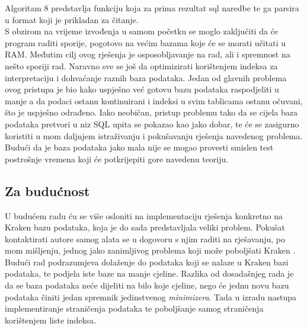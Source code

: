 \documentclass[times, utf8, zavrsni]{fer}
\begin{document}
Algoritam 8 predstavlja funkciju koja za prima rezultat sql naredbe te ga parsira u format koji je prikladan za čitanje.
\\S obzirom na vrijeme izvođenja u samom početku se moglo zaključiti da će program raditi sporije, pogotovo na većim bazama koje će se morati učitati u RAM. Međutim cilj ovog rješenja je osposobljavanje na rad, ali i spremnost na nešto sporiji rad. Naravno sve se još da optimizirati korištenjem indeksa za interpretaciju i dohvaćanje raznih baza podataka. Jedan od glavnih problema ovog pristupa je bio kako uspješno već gotovu bazu podataka raspodjeliti u manje a da podaci ostanu kontinuirani i indeksi u svim tablicama ostanu očuvani, što je uspješno odrađeno. Iako neobičan, pristup problemu tako da se cijela baza podataka pretvori u niz SQL upita se pokazao kao jako dobar, te će se zasigurno koristiti u mom daljnjem istraživanju i pokušavanju rješenja navedenog problema. Budući da je baza podataka jako mala nije se mogao provesti smislen test postrošnje vremena koji će potkrijepiti gore navedenu teoriju.
\subsection{Za budućnost}
U budućem radu ću se više osloniti na implementaciju rješenja konkretno na Kraken bazu podataka, koja je do sada predstavljala veliki problem. Pokušat kontaktirati autore samog alata se u dogovoru s njim raditi na rješavanju, po mom mišljenju, jednog jako zanimljivog problema koji može poboljšati Kraken . Budući rad podrazumjeva dolaženje do podataka koji se nalaze u Kraken bazi podataka, te podjela iste baze na manje cjeline. Razlika od dosadašnjeg rada je da se baza podataka neće dijeliti na bilo koje cjeline, nego će jednu novu bazu podataka činiti jedan spremnik jedinstvenog \textit{minimizera}. Tada u izradu nastupa implementiranje straničenja podataka te poboljšanje samog straničenja korištenjem liste indeksa.
\end{document}
